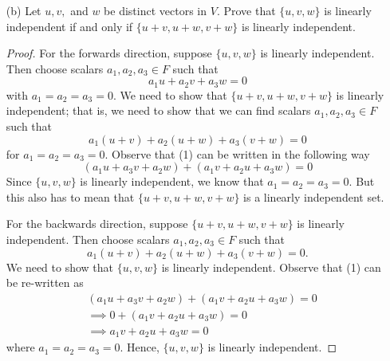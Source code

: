 \begin{enumerate}
\begin{proof}
        For the backwards direction, suppose \( \{ u + v , u - v  \}  \) is linearly independent. We need to show that \( \{ u , v  \}   \) is linearly independent. Note that \( a,b \in F  \) such that 
        \[  a(u+v) + b(u-v) = 0  \]
        for \( a = b = 0  \) since \( \{ u - v, u + v  \}  \) is linearly independent. Note that
        \begin{align*}
            a(u+v) + b(u-v) &= au + av + bu - bv \\
                            &= au - bv + av + bu \\
                            &= 0 + av + bu \\
                            &= 0. 
        \end{align*}
        Thus, \( av + bu = 0  \) where \( a,b  \) both zero. Thus, the set \( \{ u,v  \}   \) is linearly independent.
        \end{proof}
    \item[(b)] Let \( u, v ,  \) and \( w  \) be distinct vectors in \( V  \). Prove that \( \{ u,v,w  \}  \) is linearly independent if and only if \( \{ u+v , u + w , v + w  \}  \) is linearly independent.
        \begin{proof}
        For the forwards direction, suppose \( \{ u,v ,w  \}  \) is linearly independent. Then choose  scalars \( a_{1}, a_{2}, a_{3} \in  F    \) such that 
        \[  a_{1} u + a_{2} v  + a_{3} w = 0   \]
        with \( a_{1} = a_{2} = a_{3} = 0  \). We need to show that \( \{ u+v , u + w , v + w  \}  \) is linearly independent; that is, we need to show that we can find scalars \( a_{1}, a_{2}, a_{3} \in F  \) such that 
        \[  a_{1}(u+v) + a_{2} (u+w) + a_{3} (v+w) = 0 \tag{1} \]
        for \( a_{1} = a_{2} = a_{3} = 0  \). Observe that (1) can be written in the following way 
        \[  ( a_{1} u + a_{3} v + a_{2} w )  + ( a_{1} v + a_{2} u + a_{3}w )  = 0 \tag{2} \]
        Since \( \{ u,v,w \}  \) is linearly independent, we know that \( a_{1} = a_{2} = a_{3} = 0  \). But this also has to mean that \( \{ u+ v, u + w , v + w  \}  \) is a linearly independent set.
        
        For the backwards direction, suppose \( \{ u + v , u + w , v + w  \}  \) is linearly independent. Then choose scalars \( a_{1}, a_{2}, a_{3}  \in F  \) such that 
        \[  a_{1} (u + v ) + a_{2} (u + w) + a_{3} (v + w) = 0 \tag{1}.  \]
        We need to show that \( \{ u,v,w \}  \) is linearly independent. Observe that (1) can be re-written as 
        \begin{align*}
            &(a_{1} u + a_{3} v + a_{2} w )  + (a_{1} v + a_{2} u + a_{3} w ) = 0 \\
            &\implies 0 + (a_{1} v + a_{2} u + a_{3} w ) = 0 \\
            &\implies a_{1} v + a_{2} u + a_{3} w = 0
        \end{align*}
        where \( a_{1} = a_{2} = a_{3} = 0  \). Hence, \( \{ u,v ,w  \}   \) is linearly independent.
        \end{proof}
\end{enumerate}


